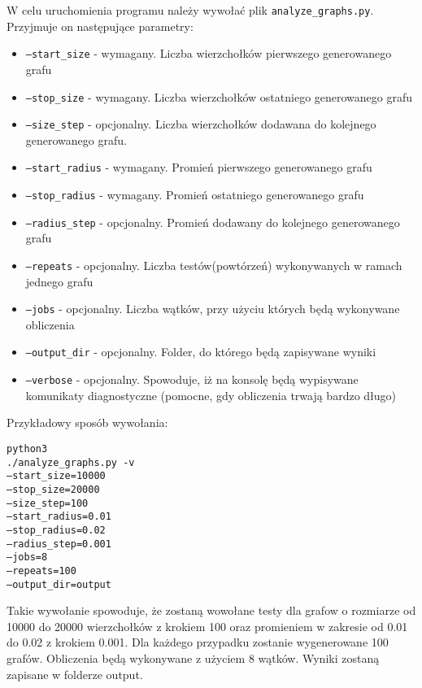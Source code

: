 		\noindent W celu uruchomienia programu należy wywołać plik \texttt{analyze\_graphs.py}. Przyjmuje on następujące parametry:
		\begin{itemize}
			\item \texttt{---start\_size} - wymagany. Liczba wierzchołków pierwszego generowanego grafu

			\item \texttt{---stop\_size} - wymagany. Liczba wierzchołków ostatniego generowanego grafu

			\item \texttt{---size\_step} - opcjonalny. Liczba wierzchołków dodawana do kolejnego generowanego grafu.

			\item \texttt{---start\_radius} - wymagany. Promień pierwszego generowanego grafu

			\item \texttt{---stop\_radius} - wymagany. Promień ostatniego generowanego grafu

			\item \texttt{---radius\_step} - opcjonalny. Promień dodawany do kolejnego generowanego grafu

			\item \texttt{---repeats} - opcjonalny. Liczba testów(powtórzeń) wykonywanych w ramach jednego grafu

			\item \texttt{---jobs} - opcjonalny. Liczba wątków, przy użyciu których będą wykonywane obliczenia

			\item \texttt{---output\_dir} - opcjonalny. Folder, do którego będą zapisywane wyniki

			\item \texttt{---verbose} - opcjonalny. Spowoduje, iż na konsolę będą wypisywane komunikaty diagnostyczne (pomocne, gdy obliczenia trwają bardzo długo)
		\end{itemize}

		Przykładowy sposób wywołania:

		\texttt{python3 \\./analyze\_graphs.py -v \\---start\_size=10000 \\---stop\_size=20000 \\---size\_step=100 \\---start\_radius=0.01 \\---stop\_radius=0.02 \\---radius\_step=0.001 \\---jobs=8 \\---repeats=100 \\---output\_dir=output}


		Takie wywołanie spowoduje, że zostaną wowołane testy dla grafow o rozmiarze od 10000 do 20000 wierzchołków z krokiem 100 oraz promieniem w zakresie od 0.01 do 0.02 z krokiem 0.001. Dla każdego przypadku zostanie wygenerowane 100 grafów. Obliczenia będą wykonywane z użyciem 8 wątków. Wyniki zostaną zapisane w folderze output.

